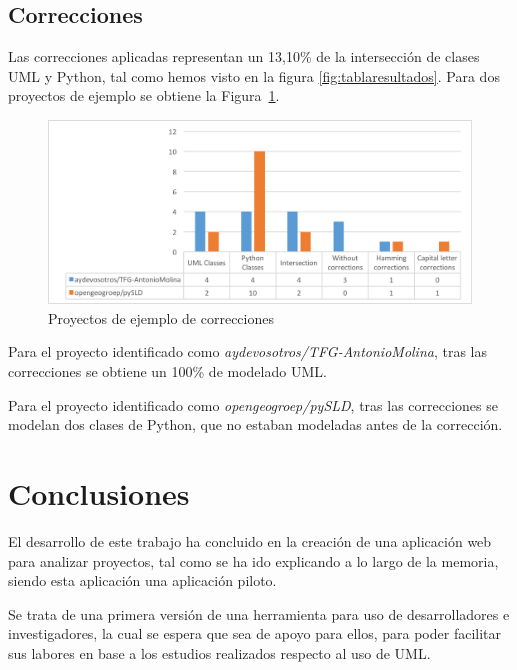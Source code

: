 \documentclass[a4paper, 12pt]{book}
\begin{document}
\section{Correcciones}
\label{subsec:correcciones}
Las correcciones aplicadas representan un 13,10\% de la intersección de clases UML y Python, tal como hemos visto en la figura
\ref{fig:tablaresultados}. Para dos proyectos de ejemplo se obtiene la Figura~\ref{fig:TFGA-M,pySLD}.

\begin{figure}[htb]
  \centering
  \includegraphics[width=\textwidth, keepaspectratio]{img/GraficasResultados/TFGA-M,pySLD}
  \caption{Proyectos de ejemplo de correcciones}
  \label{fig:TFGA-M,pySLD}
\end{figure}

Para el proyecto identificado como \textit{aydevosotros/TFG-AntonioMolina}, tras las correcciones se obtiene
un 100\% de modelado UML.

Para el proyecto identificado como \textit{opengeogroep/pySLD}, tras las correcciones se modelan dos clases de Python,
que no estaban modeladas antes de la corrección.


\cleardoublepage
\chapter{Conclusiones}
\label{chap:conclusiones}

El desarrollo de este trabajo ha concluido en la creación de una aplicación web para analizar proyectos,
tal como se ha ido explicando a lo largo de la memoria, siendo esta aplicación una aplicación piloto.

Se trata de una primera versión de una herramienta para uso de desarrolladores e investigadores,
la cual se espera que sea de apoyo para ellos, para poder facilitar sus labores en base a los estudios
realizados respecto al uso de UML.
\end{document}
